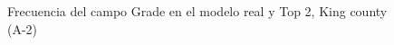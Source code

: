 \begin{figure}[H]
    \centering
    
    \caption{Frecuencia del campo Grade en el modelo real y Top 2, King county (A-2)}
    \label{frecuency-top2-grade}
\end{figure}